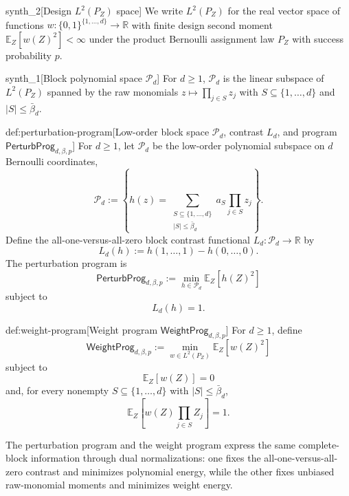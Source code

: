 \begin{definitionv}{synth_2}[Design $L^2(P_Z)$ space]
We write $L^2(P_Z)$ for the real vector space of functions $w:\{0,1\}^{\{1,\ldots,d\}}\to\mathbb R$ with finite design second moment $\mathbb E_Z[w(Z)^2]<\infty$ under the product Bernoulli assignment law $P_Z$ with success probability $p$.
\end{definitionv}

\begin{definitionv}{synth_1}[Block polynomial space \(\mathcal P_d\)]
For \(d\ge1\), \(\mathcal P_d\) is the linear subspace of \(L^2(P_Z)\) spanned by the raw monomials \(z\mapsto\prod_{j\in S} z_j\) with \(S\subseteq\{1,\ldots,d\}\) and \(|S|\le\bar\beta_d\).
\end{definitionv}

\begin{definitionv}{def:perturbation-program}[Low-order block space $\mathcal P_d$, contrast $L_d$, and program $\mathsf{PerturbProg}_{d,\beta,p}$]
For \(d\ge 1\), let \(\mathcal P_d\) be the low-order polynomial subspace on \(d\) Bernoulli coordinates,
\[
\mathcal P_d
:=
\left\{
h(z)=\sum_{\substack{S\subseteq \{1,\ldots,d\}\\ |S|\le \bar\beta_d}}
a_S\prod_{j\in S}z_j
\right\}.
\]
Define the all-one-versus-all-zero block contrast functional \(L_d:\mathcal P_d\to\mathbb R\) by
\[
L_d(h)
:=
h(1,\ldots,1)-h(0,\ldots,0).
\]
The perturbation program is
\[
\mathsf{PerturbProg}_{d,\beta,p}
:=
\min_{h\in\mathcal P_d}\mathbb E_Z[h(Z)^2]
\]
subject to
\[
L_d(h)=1.
\]
\end{definitionv}

\begin{definitionv}{def:weight-program}[Weight program \(\mathsf{WeightProg}_{d,\beta,p}\)]
For \(d\ge 1\), define
\[
\mathsf{WeightProg}_{d,\beta,p}
:=
\min_{w\in L^2(P_Z)}\mathbb E_Z[w(Z)^2]
\]
subject to
\[
\mathbb E_Z[w(Z)]=0
\]
and, for every nonempty \(S\subseteq\{1,\ldots,d\}\) with \(|S|\le\bar\beta_d\),
\[
\mathbb E_Z\left[w(Z)\prod_{j\in S}Z_j\right]=1.
\]
\end{definitionv}

The perturbation program  and the weight program  express the same complete-block information through dual normalizations: one fixes the all-one-versus-all-zero contrast and minimizes polynomial energy, while the other fixes unbiased raw-monomial moments and minimizes weight energy.

